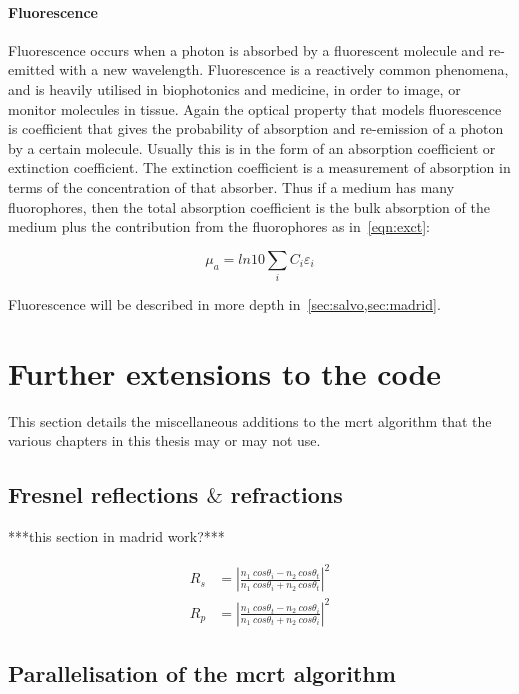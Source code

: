 \medskip

\paragraph*{Fluorescence}
Fluorescence occurs when a photon is absorbed by a fluorescent molecule and re-emitted with a new wavelength. Fluorescence	is a reactively common phenomena, and is heavily utilised in biophotonics and medicine, in order to image, or monitor molecules in tissue. Again the optical property that models fluorescence is coefficient that gives the probability of absorption and re-emission of a photon by a certain molecule. Usually this is in the form of an absorption coefficient or extinction coefficient. The extinction coefficient is a measurement of absorption in terms of the concentration of that absorber. Thus if a medium has many fluorophores, then the total absorption coefficient is the bulk absorption of the medium plus the contribution from the fluorophores as in~\cref{eqn:exct}:

\begin{equation}
\mu_a=ln10 \sum_i C_i \varepsilon_i
\label{eqn:exct}	
\end{equation}

Fluorescence will be described in more depth in~\cref{sec:salvo,sec:madrid}.

\section{Further extensions to the code}\label{sec:codefurther}
This section details the miscellaneous additions to the \gls{mcrt} algorithm that the various chapters in this thesis may or may not use.

\subsection{Fresnel reflections \texorpdfstring{$\&$}{and} refractions}\label{sec:fresnel}
***this section in madrid work?***


\begin{align}
	R_s&=\left|\frac{n_1\ cos\theta_i-n_2\ cos\theta_t}{n_1\ cos\theta_i+n_2\ cos\theta_t}\right|^2\\
	R_p&=\left|\frac{n_1\ cos\theta_t-n_2\ cos\theta_i}{n_1\ cos\theta_t+n_2\ cos\theta_i}\right|^2
\end{align}

\subsection{Parallelisation of the \texorpdfstring{\gls{mcrt}}{MCRT} algorithm}\label{sec:parasec}


